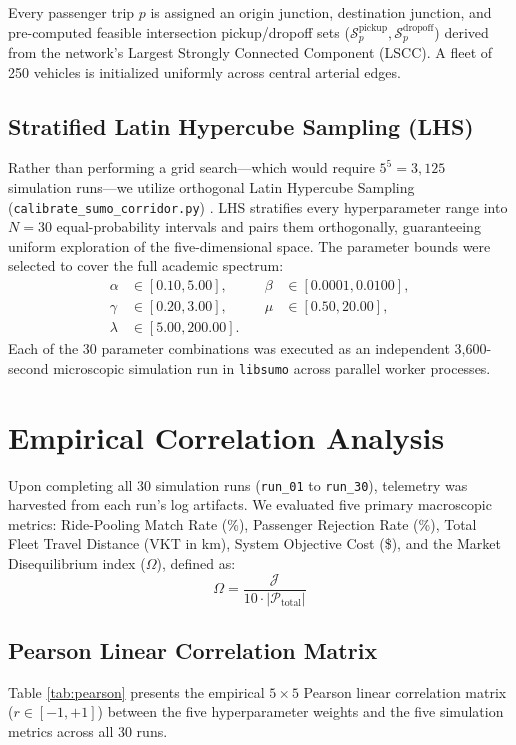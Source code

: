 \documentclass[11pt,a4paper]{article}
\begin{document}
Every passenger trip $p$ is assigned an origin junction, destination junction, and pre-computed feasible intersection pickup/dropoff sets ($\mathcal{S}_{p}^{\text{pickup}}, \mathcal{S}_{p}^{\text{dropoff}}$) derived from the network's Largest Strongly Connected Component (LSCC). A fleet of 250 vehicles is initialized uniformly across central arterial edges.

\subsection{Stratified Latin Hypercube Sampling (LHS)}
Rather than performing a grid search---which would require $5^5 = 3,125$ simulation runs---we utilize orthogonal Latin Hypercube Sampling (\texttt{calibrate\_sumo\_corridor.py}) \cite{bib4}. LHS stratifies every hyperparameter range into $N = 30$ equal-probability intervals and pairs them orthogonally, guaranteeing uniform exploration of the five-dimensional space. The parameter bounds were selected to cover the full academic spectrum:
\begin{equation*}
\begin{aligned}
\alpha &\in [0.10, 5.00], &\quad \beta &\in [0.0001, 0.0100], \\
\gamma &\in [0.20, 3.00], &\quad \mu &\in [0.50, 20.00], \\
\lambda &\in [5.00, 200.00].
\end{aligned}
\end{equation*}
Each of the 30 parameter combinations was executed as an independent 3,600-second microscopic simulation run in \texttt{libsumo} across parallel worker processes.

\section{Empirical Correlation Analysis}
Upon completing all 30 simulation runs (\texttt{run\_01} to \texttt{run\_30}), telemetry was harvested from each run's log artifacts. We evaluated five primary macroscopic metrics: Ride-Pooling Match Rate (\%), Passenger Rejection Rate (\%), Total Fleet Travel Distance (VKT in km), System Objective Cost (\$), and the Market Disequilibrium index ($\Omega$), defined as:
\begin{equation}
\Omega = \frac{\mathcal{J}}{10 \cdot |\mathcal{P}_{\text{total}}|}
\label{eq:omega}
\end{equation}

\subsection{Pearson Linear Correlation Matrix}
Table \ref{tab:pearson} presents the empirical $5 \times 5$ Pearson linear correlation matrix ($r \in [-1, +1]$) between the five hyperparameter weights and the five simulation metrics across all 30 runs.
\end{document}
